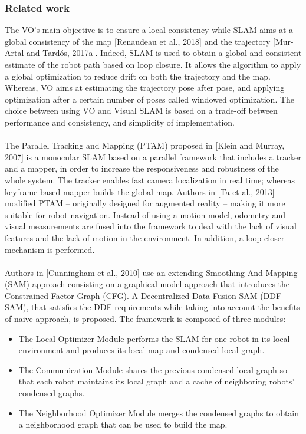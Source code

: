 \subsubsection{Related work}
The VO’s main objective is to ensure a local consistency while SLAM aims at a global consistency of the map [Renaudeau et al., 2018] and the trajectory [Mur-Artal and Tardós, 2017a]. Indeed, SLAM is used to obtain a global and consistent estimate of the robot path based on loop closure. It allows the algorithm to apply a global optimization to reduce drift on both the trajectory and the map. Whereas, VO aims at estimating the trajectory pose after pose, and applying optimization after a certain number of poses called windowed optimization. The choice between using VO and Visual SLAM is based on a trade-oﬀ between performance and consistency, and simplicity of implementation.\\\\
The Parallel Tracking and Mapping (PTAM) proposed in [Klein and Murray, 2007] is a monocular SLAM based on a parallel framework that includes a tracker and a mapper, in order to increase the responsiveness and robustness of the whole system. The tracker enables fast camera localization in real time; whereas keyframe based mapper builds the global map. Authors in [Ta et al., 2013] modiﬁed PTAM – originally designed for augmented reality – making it more suitable for robot navigation. Instead of using a motion model, odometry and visual measurements are fused into the framework to deal with the lack of visual features and the lack of motion in the environment. In addition, a loop closer mechanism is performed.\\\\
Authors in [Cunningham et al., 2010] use an extending Smoothing And Mapping (SAM) approach consisting on a graphical model approach that introduces the Constrained Factor Graph (CFG). A Decentralized Data Fusion-SAM (DDF-SAM), that satisﬁes the DDF requirements while taking into account the beneﬁts of naive approach, is proposed. The framework is composed of three modules:
\begin{itemize}
    \item The Local Optimizer Module performs the SLAM for one robot in its local environment and produces its local map and condensed local graph.
    \item The Communication Module shares the previous condensed local graph so that each robot maintains its local graph and a cache of neighboring robots’ condensed graphs.
    \item The Neighborhood Optimizer Module merges the condensed graphs to obtain a neighborhood graph that can be used to build the map.
\end{itemize}
